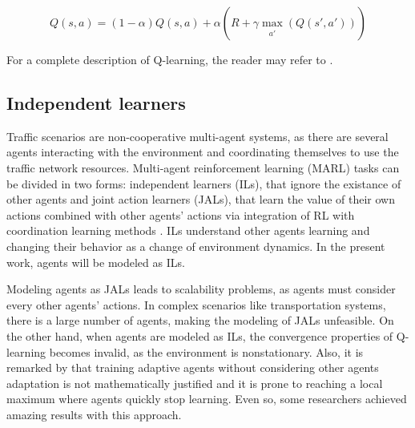 \documentclass{RITA}
\begin{document}
\begin{equation}
\label{eq:qlearning}
Q(s,a) = (1 - \alpha) Q(s,a) + \alpha (R + \gamma \max_{\substack{a'}}(Q(s',a')))
\end{equation}

For a complete description of Q-learning, the reader may refer to \cite{Watkins&Dayan1992}.



\subsection{Independent learners} 
Traffic scenarios are non-cooperative multi-agent systems, as there are several agents interacting with the environment and coordinating themselves to use the traffic network resources. Multi-agent reinforcement learning (MARL) tasks can be divided in two forms: independent learners (ILs), that ignore the existance of other agents and joint action learners (JALs), that learn the value of their own actions combined with other agents' actions via integration of RL with coordination learning methods \cite{Claus&Boutilier1998}. ILs understand other agents learning and changing their behavior as a change of environment dynamics. In the present work, agents will be modeled as ILs.

Modeling agents as JALs leads to scalability problems, as agents must consider every other agents' actions. In complex scenarios like transportation systems, there is a large number of agents, making the modeling of JALs unfeasible. On the other hand, when agents are modeled as ILs, the convergence properties of Q-learning becomes invalid, as the environment is nonstationary. Also, it is remarked by \cite{Littman1994} that training adaptive agents without considering other agents adaptation is not mathematically justified and it is prone to reaching a local maximum where agents quickly stop learning. Even so, some researchers achieved amazing results with this approach.
\end{document}
